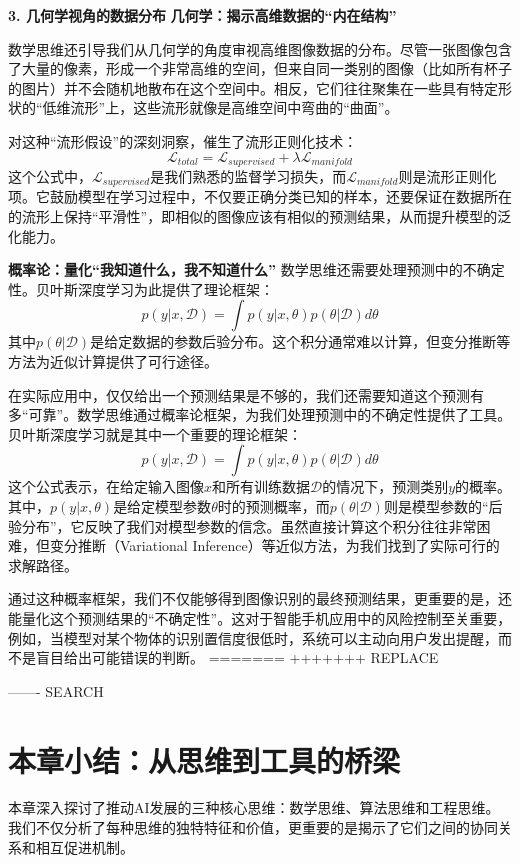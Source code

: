 \textbf{3. 几何学视角的数据分布}
\textbf{几何学：揭示高维数据的“内在结构”}

数学思维还引导我们从几何学的角度审视高维图像数据的分布。尽管一张图像包含了大量的像素，形成一个非常高维的空间，但来自同一类别的图像（比如所有杯子的图片）并不会随机地散布在这个空间中。相反，它们往往聚集在一些具有特定形状的“低维流形”上，这些流形就像是高维空间中弯曲的“曲面”。

对这种“流形假设”的深刻洞察，催生了流形正则化技术：
$$\mathcal{L}_{total} = \mathcal{L}_{supervised} + \lambda \mathcal{L}_{manifold}$$
这个公式中，$\mathcal{L}_{supervised}$是我们熟悉的监督学习损失，而$\mathcal{L}_{manifold}$则是流形正则化项。它鼓励模型在学习过程中，不仅要正确分类已知的样本，还要保证在数据所在的流形上保持“平滑性”，即相似的图像应该有相似的预测结果，从而提升模型的泛化能力。

\textbf{概率论：量化“我知道什么，我不知道什么”}
数学思维还需要处理预测中的不确定性。贝叶斯深度学习为此提供了理论框架：
$$p(y|x, \mathcal{D}) = \int p(y|x, \theta) p(\theta|\mathcal{D}) d\theta$$
其中$p(\theta|\mathcal{D})$是给定数据的参数后验分布。这个积分通常难以计算，但变分推断等方法为近似计算提供了可行途径。

在实际应用中，仅仅给出一个预测结果是不够的，我们还需要知道这个预测有多“可靠”。数学思维通过概率论框架，为我们处理预测中的不确定性提供了工具。贝叶斯深度学习就是其中一个重要的理论框架：
$$p(y|x, \mathcal{D}) = \int p(y|x, \theta) p(\theta|\mathcal{D}) d\theta$$
这个公式表示，在给定输入图像$x$和所有训练数据$\mathcal{D}$的情况下，预测类别$y$的概率。其中，$p(y|x, \theta)$是给定模型参数$\theta$时的预测概率，而$p(\theta|\mathcal{D})$则是模型参数的“后验分布”，它反映了我们对模型参数的信念。虽然直接计算这个积分往往非常困难，但变分推断（Variational Inference）等近似方法，为我们找到了实际可行的求解路径。

通过这种概率框架，我们不仅能够得到图像识别的最终预测结果，更重要的是，还能量化这个预测结果的“不确定性”。这对于智能手机应用中的风险控制至关重要，例如，当模型对某个物体的识别置信度很低时，系统可以主动向用户发出提醒，而不是盲目给出可能错误的判断。
=======
+++++++ REPLACE

------- SEARCH
\section{本章小结：从思维到工具的桥梁}

本章深入探讨了推动AI发展的三种核心思维：数学思维、算法思维和工程思维。我们不仅分析了每种思维的独特特征和价值，更重要的是揭示了它们之间的协同关系和相互促进机制。

